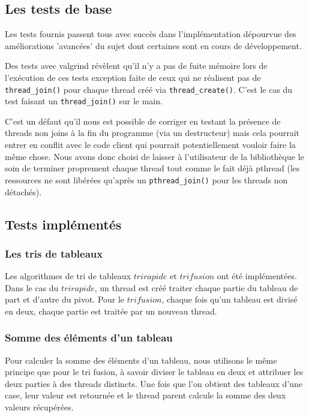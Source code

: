 \subsection{Les tests de base}

Les tests fournis passent tous avec succès dans l'implémentation dépourvue des améliorations 'avancées' du sujet dont certaines sont en cours de développement.

Des tests avec valgrind révèlent qu'il n'y a pas de fuite mémoire lors de l'exécution de ces tests exception faite de ceux qui ne réalisent pas de \verb!thread_join()! pour chaque thread créé via \verb!thread_create()!. C'est le cas du test faisant un \verb!thread_join()! sur le main.

C'est un défaut qu'il nous est possible de corriger en testant la présence de threads non joins à la fin du programme (via un destructeur) mais cela pourrait entrer en conflit avec le code client qui pourrait potentiellement vouloir faire la même chose. Nous avons donc choisi de laisser à l'utilisateur de la bibliothèque le soin de terminer proprement chaque thread tout comme le fait déjà pthread (les ressources ne sont libérées qu'après un \verb!pthread_join()! pour les threads non détachés).


\subsection{Tests implémentés}

\subsubsection{Les tris de tableaux}
Les algorithmes de tri de tableaux $tri rapide$ et $tri fusion$ ont été implémentées. Dans le cas du $tri rapide$, un thread est créé traiter chaque partie du tableau de part et d'autre du pivot. Pour le $tri fusion$, chaque fois qu'un tableau est divisé en deux, chaque partie est traitée par un nouveau thread.\\



\subsubsection{Somme des éléments d'un tableau}
Pour calculer la somme des éléments d'un tableau, nous utilisons le même principe que pour le tri fusion, à savoir diviser le tableau en deux et attribuer les deux parties à des threads distincts. Une fois que l'on obtient des tableaux d'une case, leur valeur est retournée et le thread parent calcule la somme des deux valeurs récupérées.

